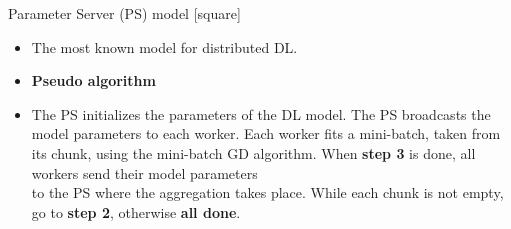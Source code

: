 \begin{frame}{Parameter Server (PS) model}
    [square]
    \begin{itemize}
        \item{The most known model for distributed DL.}
        \vspace{0.2}
        \item{\textbf{Pseudo algorithm}}
        \vspace{0.1}
        \item[]{
        \begin{algorithm}[H]
            \begin{algorithmic}[1]
                \STATE The PS initializes the parameters of the DL model.
                \STATE The PS broadcasts the model parameters to each worker.
                \STATE Each worker fits a mini-batch, taken from its chunk, using the mini-batch GD algorithm.
                \STATE When \textbf{step 3} is done, all workers send their model parameters\\to the PS where the aggregation takes place.
                \STATE While each chunk is not empty, go to \textbf{step 2}, otherwise \textbf{all done}.
            \end{algorithmic}
            \label{alg:param-server}
        \end{algorithm}
        }
    \end{itemize}
\end{frame}